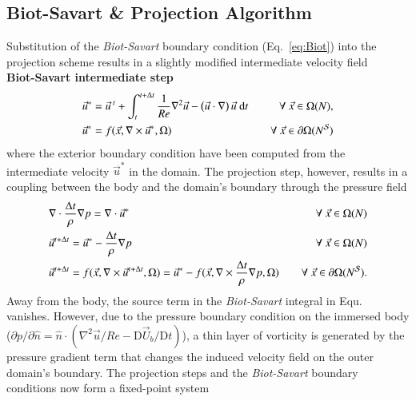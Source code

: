 \documentclass[preprint,12pt]{elsarticle}
\begin{document}
\subsection{Biot-Savart \& Projection Algorithm}\label{sec:Biot_projection}
Substitution of the \emph{Biot-Savart} boundary condition (Eq.~\ref{eq:Biot}) into the projection scheme results in a slightly modified intermediate velocity field\\
\textbf{Biot-Savart intermediate step}
\begin{align}
    &\vec{u}^* = \vec{u}\,^t + \int_{t}^{t+\Delta t}\frac{1}{Re}\nabla^2\vec{u} -\left(\vec{u}\cdot\nabla\right)\vec{u}\text{ d}t &\quad\forall\ \vec{x}\in\Omega (N),\\
    &\vec{u}^* = f(\vec{x},\nabla\times \vec{u}^*,\Omega) &\quad\forall\ \vec{x}\in\partial\Omega (N^{\cal S})
\end{align}
where the exterior boundary condition have been computed from the intermediate velocity $\vec{u}^*$ in the domain. The projection step, however, results in a coupling between the body and the domain's boundary through the pressure field
\begin{align}
  &\nabla\cdot\frac{\Delta t}{\rho}\nabla p = \nabla\cdot \vec{u}^* &\forall\ \vec{x}\in\Omega (N)\\
  &\vec{u}^{t+\Delta t} = \vec{u}^*-\frac{\Delta t}{\rho}\nabla p &\quad\forall\ \vec{x}\in\Omega (N)\\
  &\vec{u}^{t+\Delta t} = f(\vec{x},\nabla\times \vec{u}^{t+\Delta t},\Omega)= \vec{u}^*-f(\vec{x},\nabla\times\frac{\Delta t}{\rho}\nabla p,\Omega) &\quad\forall\ \vec{x}\in\partial\Omega (N^{\cal S}).
\end{align}
Away from the body, the source term in the \emph{Biot-Savart} integral in Equ.~\theequation~ vanishes. However, due to the pressure boundary condition on the immersed body ($\partial p/\partial\hat{n}=\hat{n}\cdot(\nabla^2\vec{u}/Re-\text{D}\vec{U}_b/\text{D}t)$), a thin layer of vorticity is generated by the pressure gradient term that changes the induced velocity field on the outer domain's boundary. The projection steps and the \emph{Biot-Savart} boundary conditions now form a fixed-point system
\end{document}
